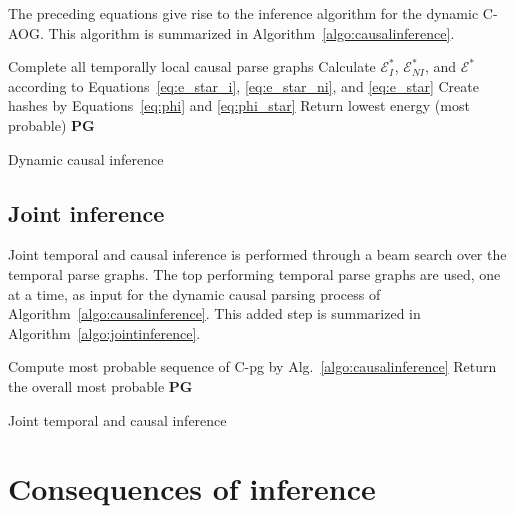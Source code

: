 \documentclass[10pt,journal,letterpaper,compsoc]{IEEEtran}
\begin{document}
The preceding equations give rise to the inference algorithm for the dynamic C-AOG.  This algorithm is summarized in Algorithm~\ref{algo:causalinference}.


\LinesNumbered
\begin{algorithm}[htb]
\small
{}
\BlankLine
{}
{
	Complete all temporally local causal parse graphs\;
	{
		Calculate $\mathcal{E}^{*}_{I}$, $\mathcal{E}^{*}_{NI}$, and $\mathcal{E}^{*}$ according to Equations~\ref{eq:e_star_i}, \ref{eq:e_star_ni}, and \ref{eq:e_star}\;
		Create hashes by Equations~\ref{eq:phi} and \ref{eq:phi_star}\;
	}
}
Return lowest energy (most probable) $\mathbf{PG}$\;
\caption{Dynamic causal inference}\label{algo:causalinference}
\end{algorithm}


\subsection{Joint inference}

Joint temporal and causal inference is performed through a beam search over the temporal parse graphs.  The top performing temporal parse graphs are used, one at a time,  as input for the dynamic causal parsing process of Algorithm~\ref{algo:causalinference}.  This added step is summarized in Algorithm~\ref{algo:jointinference}.   

\LinesNumbered
\begin{algorithm}[htb]
\small
{}
\BlankLine
	{
	   Compute most probable sequence of C-pg by Alg.~\ref{algo:causalinference}\;
	}
Return the overall most probable $\mathbf{PG}$\;
\caption{Joint temporal and causal inference}\label{algo:jointinference}
\end{algorithm}




   
   

\section{Consequences of inference}
\end{document}
